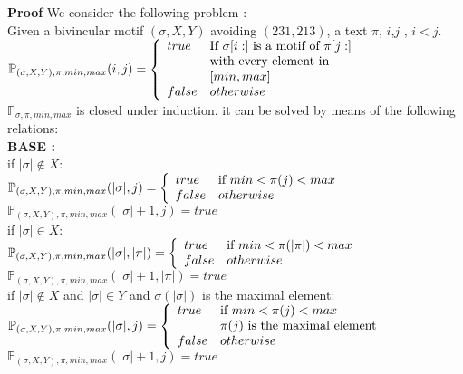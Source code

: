 \documentclass[a4paper]{llncs}
\newcommand{\ptext}{\pi}
\newcommand{\pmotif}{\sigma}
\newcommand{\x}{X}
\newcommand{\y}{Y}
\newcommand{\bmotif}{(\sigma,\x,\y)}
\begin{document}
			\textbf{Proof }
			We consider the following problem :\\
			
			Given a bivincular motif $\bmotif$ avoiding $(231,213)$,
			a text $\ptext$, $i$,$j$ , $i<j$.\\
			
			$\mathbb{P}_{\bmotif,\ptext,min,max}(i,j)= \left\{ 
				\begin{array}{l l}
					true & \text{If $\pmotif[i:]$ is a motif of $\ptext[j:]$}\\
						& \text{with every element in}\\ 
						&[min,max]\\
		
					false & otherwise\\
				\end{array} \right.$\\
		
		
		
		
			$\mathbb{P}_{\pmotif,\ptext,min,max}$ is closed under induction. 
			it can be
			solved by means of the following relations:\\
			
			
			\textbf{BASE :} \\
			
			if $|\pmotif| \notin  \x : $\\		
			$\mathbb{P}_{\bmotif,\ptext,min,max}(|\pmotif|,j)= \left\{ 
					\begin{array}{l l}
						true & \text{if $min<\ptext(j)<max$
						}\\
						false & otherwise\\
					\end{array} \right. $\\	
			$\mathbb{P}_{\bmotif,\ptext,min,max}(|\pmotif|+1,j)= true $\\
			
			if $|\pmotif| \in  \x : $\\		
			$\mathbb{P}_{\bmotif,\ptext,min,max}(|\pmotif|,|\ptext|)= \left\{ 
					\begin{array}{l l}
						true & \text{if $min<\ptext(|\ptext|)<max$
						}\\
						false & otherwise\\
					\end{array} \right. $\\	
			$\mathbb{P}_{\bmotif,\ptext,min,max}(|\pmotif|+1,|\ptext|)= true $\\
			
			if $|\pmotif| \notin  \x$  
			and $|\pmotif| \in  \y$ 
			and $\pmotif(|\pmotif|)$ is the maximal element: \\		
			$\mathbb{P}_{\bmotif,\ptext,min,max}(|\pmotif|,j)= \left\{ 
					\begin{array}{l l}
						true & \text{if $min<\ptext(j)<max$
						}\\
						&\text{$\ptext(j)$ is the maximal element}\\
						false & otherwise\\
					\end{array} \right. $\\	
			$\mathbb{P}_{\bmotif,\ptext,min,max}(|\pmotif|+1,j)= true $\\
			
\end{document}
